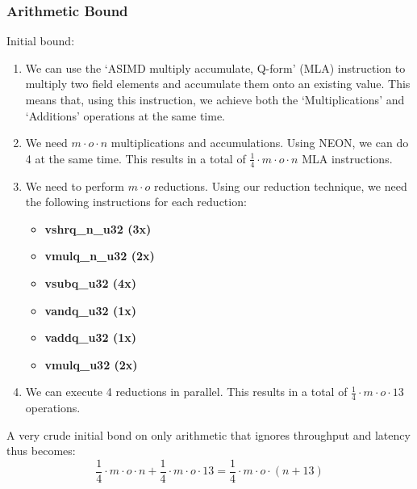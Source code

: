 \documentclass[a4paper]{article}
\begin{document}
\subsubsection{Arithmetic Bound}
Initial bound:
\begin{enumerate}
    \item We can use the `ASIMD multiply accumulate, Q-form' (MLA) instruction to multiply two field elements and accumulate them onto an existing value. This means that, using this instruction, we achieve both the `Multiplications' and `Additions' operations at the same time.
    \item We need $m \cdot o \cdot n$ multiplications and accumulations. Using NEON, we can do 4 at the same time. This results in a total of $\frac{1}{4} \cdot m \cdot o \cdot n$ MLA instructions.
    \item We need to perform $m \cdot o$ reductions. Using our reduction technique, we need the following instructions for each reduction:
    \begin{itemize}
        \item \textbf{vshrq\_n\_u32 (3x)}
        \item \textbf{vmulq\_n\_u32 (2x)}
        \item \textbf{vsubq\_u32 (4x)}
        \item \textbf{vandq\_u32 (1x)}
        \item \textbf{vaddq\_u32 (1x)}
        \item \textbf{vmulq\_u32 (2x)}
    \end{itemize}
    \item We can execute 4 reductions in parallel. This results in a total of $\frac{1}{4} \cdot m \cdot o \cdot 13$ operations.
\end{enumerate}
A very crude initial bond on only arithmetic that ignores throughput and latency thus becomes:
\[
    \frac{1}{4} \cdot m \cdot o \cdot n + \frac{1}{4} \cdot m \cdot o \cdot 13 = \frac{1}{4} \cdot m \cdot o \cdot (n + 13)
\]
\end{document}
